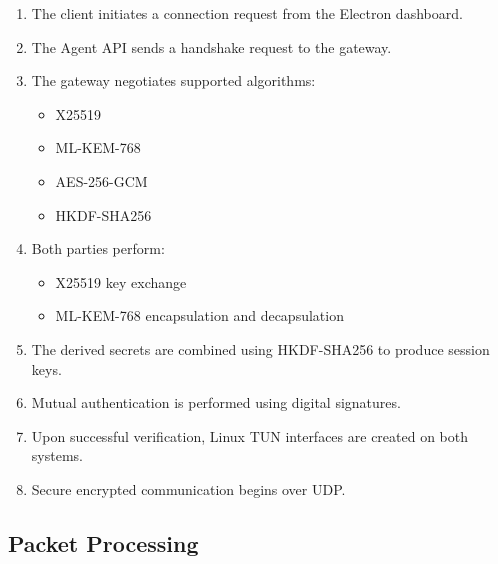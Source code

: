 \begin{enumerate}
    \item The client initiates a connection request from the Electron dashboard.
    
    \item The Agent API sends a handshake request to the gateway.
    
    \item The gateway negotiates supported algorithms:
    \begin{itemize}
        \item X25519
        \item ML-KEM-768
        \item AES-256-GCM
        \item HKDF-SHA256
    \end{itemize}

    \item Both parties perform:
    \begin{itemize}
        \item X25519 key exchange
        \item ML-KEM-768 encapsulation and decapsulation
    \end{itemize}

    \item The derived secrets are combined using HKDF-SHA256 to produce session keys.

    \item Mutual authentication is performed using digital signatures.

    \item Upon successful verification, Linux TUN interfaces are created on both systems.

    \item Secure encrypted communication begins over UDP.
\end{enumerate}

\subsection{Packet Processing}

